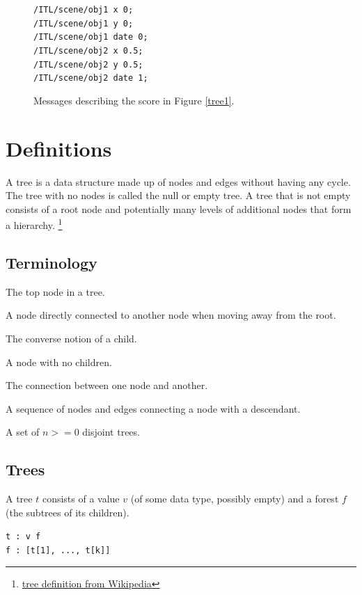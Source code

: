\documentclass{article}
\newcommand{\code}	[2][0.9]		{\vspace{0mm}\begin{center}\colorbox{mygrey}{
							\begin{minipage}[t]{#1\columnwidth} 
							{\small \texttt{#2}}
							\end{minipage}}\end{center}}
\begin{document}
\begin{figure}
\code{/ITL/scene/obj1 x 0;\\
/ITL/scene/obj1 y    0;\\
/ITL/scene/obj1 date 0;\\
/ITL/scene/obj2 x    0.5;\\
/ITL/scene/obj2 y    0.5;\\
/ITL/scene/obj2 date 1;
}
\caption{Messages describing the score in Figure \ref{tree1}.}
\label{script1}
\end{figure}


\section{Definitions}

A tree is a data structure made up of nodes and edges without having any cycle. The tree with no nodes is called the null or empty tree. A tree that is not empty consists of a root node and potentially many levels of additional nodes that form a hierarchy. \footnote{\href{https://en.wikipedia.org/wiki/Tree_(data_structure)}{tree definition from Wikipedia}}


\subsection{Terminology}

\begin{description}
 \setlength\itemsep{0.0em}
\item[Root]	The top node in a tree.
\item[Child]	A node directly connected to another node when moving away from the root.
\item[Parent]	The converse notion of a child.
\item[Leaf]	A node with no children.
\item[Edge]	The connection between one node and another.
\item[Path]	A sequence of nodes and edges connecting a node with a descendant.
\item[Forest]	A set of $n >= 0$ disjoint trees.
\end{description}

\subsection{Trees}
A tree $t$ consists of a value $v$ (of some data type, possibly empty) and a forest $f$ (the subtrees of its children).
\code{t :  v f \\
f : [t[1], ..., t[k]] 
}
\end{document}
